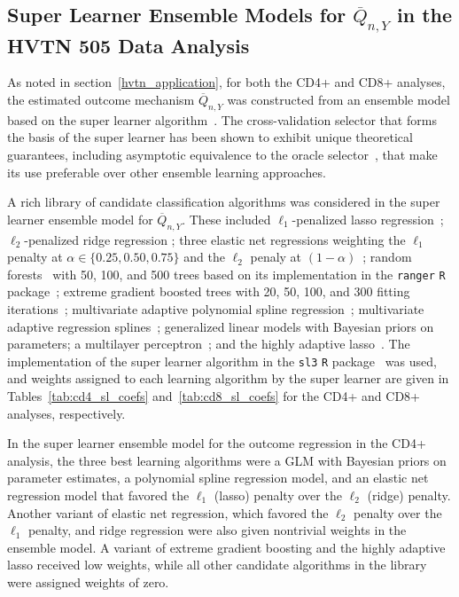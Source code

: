 \subsection{Super Learner Ensemble Models for $\overline{Q}_{n,Y}$ in the HVTN
  505 Data Analysis}\label{hvtn_sl_details}

As noted in section~\ref{hvtn_application}, for both the CD4+ and CD8+ analyses,
the estimated outcome mechanism $\overline{Q}_{n,Y}$ was constructed from an
ensemble model based on the super learner algorithm~\citep{vdl2007super}. The
cross-validation selector that forms the basis of the super learner has been
shown to exhibit unique theoretical guarantees, including asymptotic equivalence
to the oracle selector~\citep{vdl2004asymptotic, vdl2006cross, vdl2006oracle},
that make its use preferable over other ensemble learning approaches.

A rich library of candidate classification algorithms was considered in the
super learner ensemble model for $\overline{Q}_{n,Y}$. These included
$\ell_1$-penalized lasso regression~\citep{tibshirani1996regression,
friedman2009glmnet}; $\ell_2$-penalized ridge regression
\citep{tikhonov1977solutions,hoerl1970ridge,friedman2009glmnet}; three elastic
net regressions weighting the $\ell_1$ penalty at $\alpha \in \{0.25, 0.50,
0.75\}$ and the $\ell_2$ penaly at
$(1-\alpha)$~\citep{zou2003regression,friedman2009glmnet}; random
forests~\citep{breiman2001random} with 50, 100, and 500 trees based on its
implementation in the \texttt{ranger} \texttt{R}
package~\citep{wright2017ranger}; extreme gradient boosted trees with 20, 50,
100, and 300 fitting iterations~\citep{chen2016xgboost}; multivariate adaptive
polynomial spline regression~\citep{kooperberg1997polychotomous,stone1994use};
multivariate adaptive regression splines~\citep{friedman1991multivariate};
generalized linear models with Bayesian priors on parameters; a multilayer
perceptron~\citep{rosenblatt1961principles}; and the highly adaptive
lasso~\citep{vdl2017generally,benkeser2016highly,coyle2021hal9001}. The
implementation of the super learner algorithm in the \texttt{sl3} \texttt{R}
package~\citep{coyle2021sl3} was used, and weights assigned to each learning
algorithm by the super learner are given in Tables~\ref{tab:cd4_sl_coefs}
and~\ref{tab:cd8_sl_coefs} for the CD4+ and CD8+ analyses, respectively.


In the super learner ensemble model for the outcome regression in the CD4+
analysis, the three best learning algorithms were a GLM with Bayesian priors on
parameter estimates, a polynomial spline regression model, and an elastic net
regression model that favored the $\ell_1$ (lasso) penalty over the $\ell_2$
(ridge) penalty. Another variant of elastic net regression, which favored the
$\ell_2$ penalty over the $\ell_1$ penalty, and ridge regression were also given
nontrivial weights in the ensemble model. A variant of extreme gradient boosting
and the highly adaptive lasso received low weights, while all other candidate
algorithms in the library were assigned weights of zero.

